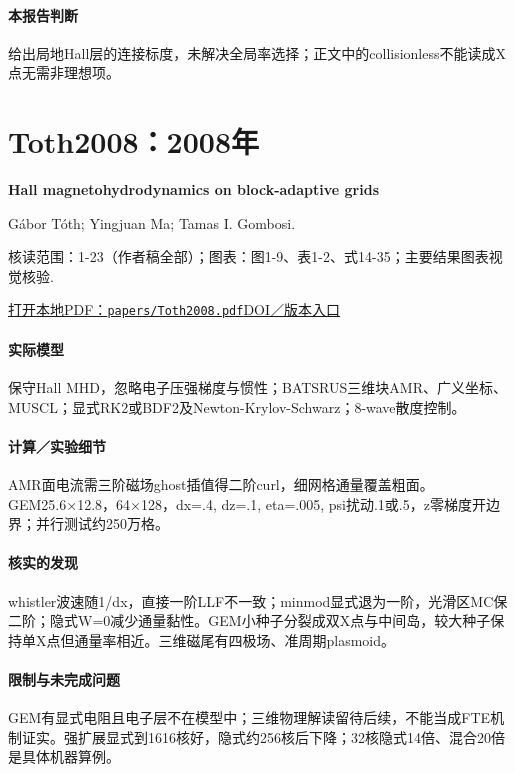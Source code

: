 \paragraph{本报告判断}给出局地Hall层的连接标度，未解决全局率选择；正文中的collisionless不能读成X点无需非理想项。

\section{Toth2008：2008年}\label{paper:Toth2008}

\textbf{Hall magnetohydrodynamics on block-adaptive grids}\citep{Toth2008}\

Gábor Tóth;  Yingjuan Ma;  Tamas I. Gombosi.

\textsf{核读范围：}1-23（作者稿全部）；\textsf{图表：}图1-9、表1-2、式14-35；主要结果图表视觉核验.

\href{run:papers/Toth2008.pdf}{打开本地PDF：\texttt{papers/Toth2008.pdf}}\quad\href{https://doi.org/10.1016/j.jcp.2008.04.010}{DOI／版本入口}

\paragraph{实际模型}保守Hall MHD，忽略电子压强梯度与惯性；BATSRUS三维块AMR、广义坐标、MUSCL；显式RK2或BDF2及Newton-Krylov-Schwarz；8-wave散度控制。

\paragraph{计算／实验细节}AMR面电流需三阶磁场ghost插值得二阶curl，细网格通量覆盖粗面。GEM25.6×12.8，64×128，dx=.4, dz=.1, eta=.005, psi扰动.1或.5，z零梯度开边界；并行测试约250万格。

\paragraph{核实的发现}whistler波速随1/dx，直接一阶LLF不一致；minmod显式退为一阶，光滑区MC保二阶；隐式W=0减少通量黏性。GEM小种子分裂成双X点与中间岛，较大种子保持单X点但通量率相近。三维磁尾有四极场、准周期plasmoid。

\paragraph{限制与未完成问题}GEM有显式电阻且电子层不在模型中；三维物理解读留待后续，不能当成FTE机制证实。强扩展显式到1616核好，隐式约256核后下降；32核隐式14倍、混合20倍是具体机器算例。

